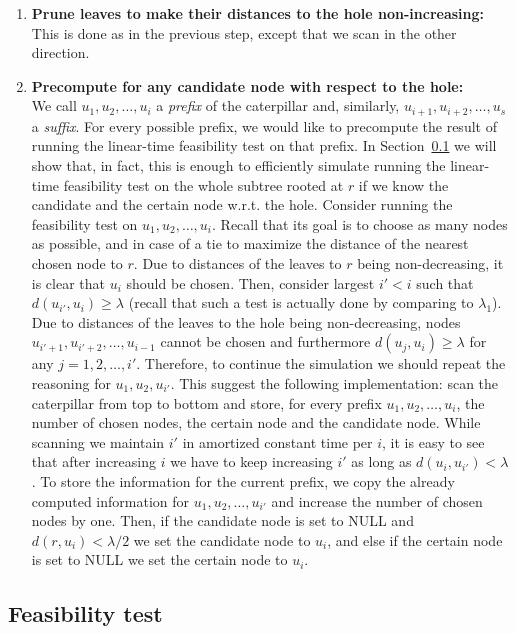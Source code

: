 \documentclass[a4paper,UKenglish]{lipics-v2016}
\theoremstyle{plain}
\begin{document}
\begin{enumerate}
\item \label{making distances from the hole monotone}
\textbf{Prune leaves to make their distances to the hole non-increasing:}\\
This is done as in the previous step, except that we scan in the other direction.
\item\textbf{Precompute for any candidate node with respect to the hole:}\\
\label{precompute for any candidate node}
We call $u_{1},u_{2},\ldots,u_{i}$ a {\em prefix} of the caterpillar and, similarly, $u_{i+1},u_{i+2}, \ldots,u_{s}$ a {\em suffix}.
For every possible prefix, we would like to precompute the result of running the linear-time feasibility
test on that prefix. In Section~\ref{sec:feasibility test} we will show that, in fact, this is enough to efficiently
simulate running the linear-time feasibility test on the whole subtree rooted at $r$ if we know the candidate
and the certain node w.r.t. the hole. Consider running the feasibility test on $u_{1},u_{2},\ldots,u_{i}$.
Recall that its goal is to choose as many nodes as possible, and in case of a tie to maximize the distance of the
nearest chosen node to $r$. Due to distances of the leaves to $r$ being non-decreasing, it is clear that
$u_{i}$ should be chosen. Then, consider largest $i'<i$ such that $d(u_{i'},u_{i})\geq \lambda$ (recall that
such a test is actually done by comparing to $\lambda_{1}$). Due to distances of the leaves to the hole
being non-decreasing, nodes $u_{i'+1},u_{i'+2},\ldots,u_{i-1}$ cannot be chosen and furthermore $d(u_{j},u_{i})\geq \lambda$
for any $j=1,2,\ldots,i'$. Therefore, to continue the simulation we should repeat the reasoning for $u_{1},u_{2},u_{i'}$.
This suggest the following implementation: scan the caterpillar from top to bottom and store, for every prefix $u_{1},u_{2},\ldots,u_{i}$,
the number of chosen nodes, the certain node and the candidate node. While scanning we maintain $i'$ in amortized constant time per $i$,
it is easy to see that after increasing $i$ we have to keep increasing $i'$ as long as $d(u_{i},u_{i'})<\lambda$.
To store the information for the current prefix, we copy the already computed information for $u_{1},u_{2},\ldots,u_{i'}$
and increase the number of chosen nodes by one. Then, if the candidate node is set to NULL and $d(r,u_{i})<\lambda/2$
we set the candidate node to $u_{i}$, and else if the certain node is set to NULL we set the certain node to $u_{i}$.
\end{enumerate}

\subsection{Feasibility test}
\label{sec:feasibility test}
\end{document}
